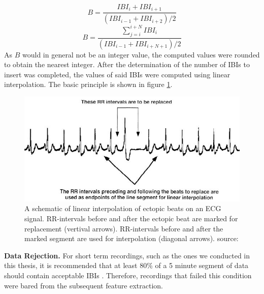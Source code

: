 \begin{equation}\label{Bsingle}
B = \frac{IBI_{i}+IBI_{i+1}}{(IBI_{i-1}+IBI_{i+2})/2}
\end{equation}
\begin{equation}\label{Bseq}
B = \frac{\sum_{j=i}^{i+N} IBI_{i}}{(IBI_{i-1}+IBI_{i+N+1})/2}
\end{equation}
As $B$ would in general not be an integer value, the computed values were rounded to obtain the nearest integer. After the determination of the number of IBIs to insert was completed, the values of said IBIs were computed using linear interpolation. The basic principle is shown in figure \ref{ebrep}.

\begin{figure}[ht]
	\centering
  \includegraphics[width=1.0\textwidth, angle=0]{images/eb_replacement.jpg}
	\caption[Linear Interpolation of Ectopic Beats]{A schematic of linear interpolation of ectopic beats on an ECG signal. RR-intervals before and after the ectopic beat are marked for replacement (vertival arrows). RR-intervals before and after the marked segment are used for interpolation (diagonal arrows). source: \cite{Lippman1994}}
	\label{ebrep}
\end{figure}
\textbf{Data Rejection.} For short term recordings, such as the ones we conducted in this thesis, it is recommended that at least 80\% of a 5 minute segment of data should contain acceptable IBIs \cite{Clifford2002}. Therefore, recordings that failed this condition were bared from the subsequent feature extraction.

\newpage
